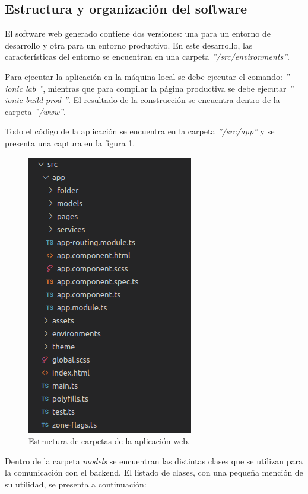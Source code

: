 \subsection{Estructura y organización del software}

El software web generado contiene dos versiones: una para un entorno de desarrollo y otra para un entorno productivo. En este desarrollo, las características del entorno se encuentran en una carpeta \textit{''/src/environments''}. 

Para ejecutar la aplicación en la máquina local se debe ejecutar el comando:  \textit{'' ionic lab ''}, mientras que para compilar la página productiva se debe ejecutar \textit{'' ionic build prod ''}. El resultado de la construcción se encuentra dentro de la carpeta \textit{''/www''}.

Todo el código de la aplicación se encuentra en la carpeta \textit{''/src/app''} y se presenta una captura en la figura \ref{fig:Carpetas página web.}.


\begin{figure}[ht]
	\centering
	\includegraphics[scale=.60]{./Figures/codigoFront.png}
	\caption{Estructura de carpetas de la aplicación web.}
	\label{fig:Carpetas página web.}
\end{figure}


Dentro de la carpeta \textit{models} se encuentran las distintas clases que se utilizan para la comunicación con el backend. El listado de clases, con una pequeña mención de su utilidad, se presenta a continuación:

